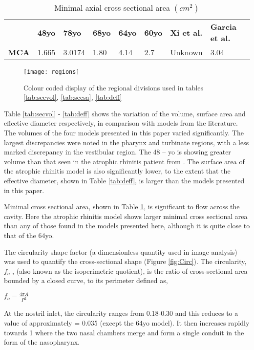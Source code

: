 \begin{table}
  \begin{tabular}{p{}p{}p{}p{}p{}p{}p{}p{}}
& \textbf{48yo}  & \textbf{78yo} & \textbf{68yo} & \textbf{64yo} & \textbf{60yo} & \textbf{Xi et al.} & \textbf{Garcia et al.}\\
 \cline{2-8}
 \textbf{MCA}&1.665&3.0174&1.80&4.14&2.7&Unknown&3.04
\end{tabular}
 \caption{Minimal axial cross sectional area $(cm^2)$}\label{tab:mca}
\end{table}

\begin{figure}
\centering
\texttt{[image: regions]}
\caption{Colour coded display of the regional divisions used in tables \ref{tab:secvol}, \ref{tab:secsa}, \ref{tab:deff}} 
\label{fig:regions}
\end{figure} 

Table \ref{tab:secvol} - \ref{tab:deff} shows the variation of the volume, surface area and effective diameter respectively, in comparison with models from the literature. The volumes of the four models presented in this paper varied significantly. The largest discrepancies were noted in the pharynx and turbinate regions, with a less marked discrepancy in the vestibular region. The 48 – yo is showing greater volume than that seen in the atrophic rhinitis patient from \cite{Garcia2007}. The surface area of the atrophic rhinitis model is also significantly lower, to the extent that the effective diameter, shown in Table \ref{tab:deff}, is larger than the models presented in this paper.

Minimal cross sectional area, shown in Table \ref{tab:mca}, is significant to flow across the cavity\cite{Lindemann2008}. Here the atrophic rhinitis model shows larger minimal cross sectional area than any of those found in the models presented here, although it is quite close to that of the 64yo.

The circularity shape factor (a dimensionless quantity used in image analysis) was used to quantify the cross-sectional shape (Figure \ref{fig:Circ}). The circularity, $f_o$ , (also known as the isoperimetric quotient), is the ratio of cross-sectional area bounded by a closed curve, to its perimeter defined as, 

$ f_o = \frac{4 \pi A}{P^2} $

At the nostril inlet, the circularity ranges from 0.18-0.30 and this reduces to a value of approximately = 0.035 (except the 64yo model). It then increases rapidly towards 1 where the two nasal chambers merge and form a single conduit in the form of the nasopharynx.








